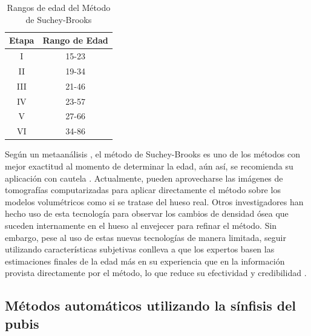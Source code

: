 \begin{table}[h]
\centering
\begin{tabular}{|c|c|}
\hline
\rowcolor[HTML]{FFCB2F} 
{Etapa} & {Rango de Edad} \\ \hline
I & 15-23 \\ \hline
II & 19-34 \\ \hline
III & 21-46 \\ \hline
IV & 23-57 \\ \hline
V & 27-66 \\ \hline
VI & 34-86 \\ \hline
\end{tabular}
\caption{Rangos de edad del Método de Suchey-Brooks}
\label{table:age_suchey_brooks}
\end{table}


Según un metaanálisis \cite{schanandore2022accuracy}, el método de Suchey-Brooks es uno de los métodos con mejor exactitud al momento de determinar la edad, aún así, se recomienda su aplicación con cautela \cite{priya2017methods}. Actualmente, pueden aprovecharse las imágenes de tomografías computarizadas para aplicar directamente el método sobre los modelos volumétricos como si se tratase del hueso real. Otros investigadores \cite{wade2011preliminary,villa2013forensic,lottering2014morphometric,lopez2015image} han hecho uso de esta tecnología para observar los cambios de densidad ósea que suceden internamente en el hueso al envejecer para refinar el método. Sin embargo, pese al uso de estas nuevas tecnologías de manera limitada, seguir utilizando características subjetivas conlleva a que los expertos basen las estimaciones finales de la edad más en su experiencia que en la información provista directamente por el método, lo que reduce su efectividad y credibilidad \cite{garvin_current_2012}.

\subsection{Métodos automáticos utilizando la sínfisis del pubis}



